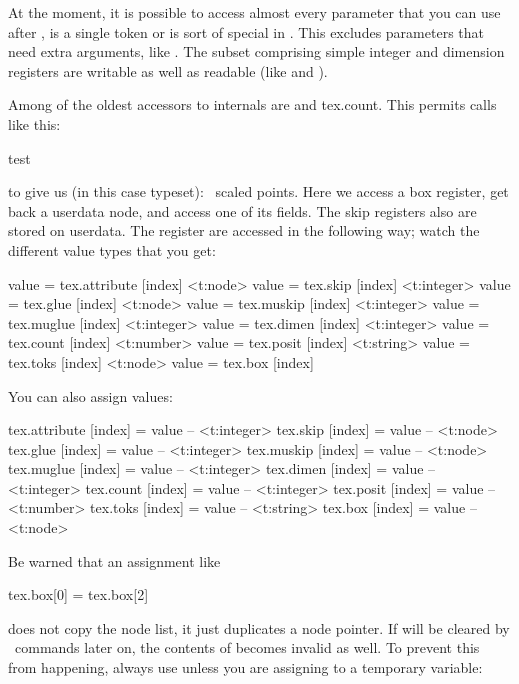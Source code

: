 At the moment, it is possible to access almost every parameter that you can use
after \type {\the}, is a single token or is sort of special in \TEX. This
excludes parameters that need extra arguments, like \typ {\the \scriptfont}. The
subset comprising simple integer and dimension registers are writable as well as
readable (like \type {\tracingcommands} and \type {\parindent}).

\stopsubsection

\startsubsection[title=Registers]

Among of the oldest accessors to internals are  and \type
{tex.count}. This permits calls like this:

\startbuffer
{}\hbox{test}
\stopbuffer

\typebuffer

to give us (in this case typeset): \inlinebuffer\ scaled points. Here we access a
box register, get back a userdata node, and access one of its fields. The skip
registers also are stored on userdata. The register are accessed in the following
way; watch the different value types that you get:

 value = tex.attribute [index]
<t:node>    value = tex.skip      [index]
<t:integer> value = tex.glue      [index]
<t:node>    value = tex.muskip    [index]
<t:integer> value = tex.muglue    [index]
<t:integer> value = tex.dimen     [index]
<t:integer> value = tex.count     [index]
<t:number>  value = tex.posit     [index]
<t:string>  value = tex.toks      [index]
<t:node>    value = tex.box       [index]
\stoptyping

You can also assign values:

\starttyping[option=LUA]
tex.attribute [index] = value -- <t:integer>
tex.skip      [index] = value -- <t:node>
tex.glue      [index] = value -- <t:integer>
tex.muskip    [index] = value -- <t:node>
tex.muglue    [index] = value -- <t:integer>
tex.dimen     [index] = value -- <t:integer>
tex.count     [index] = value -- <t:integer>
tex.posit     [index] = value -- <t:number>
tex.toks      [index] = value -- <t:string>
tex.box       [index] = value -- <t:node>
\stoptyping

Be warned that an assignment like

\starttyping[option=LUA]
tex.box[0] = tex.box[2]
\stoptyping

does not copy the node list, it just duplicates a node pointer. If 
will be cleared by \TEX\ commands later on, the contents of  becomes
invalid as well. To prevent this from happening, always use 
unless you are assigning to a temporary variable:

